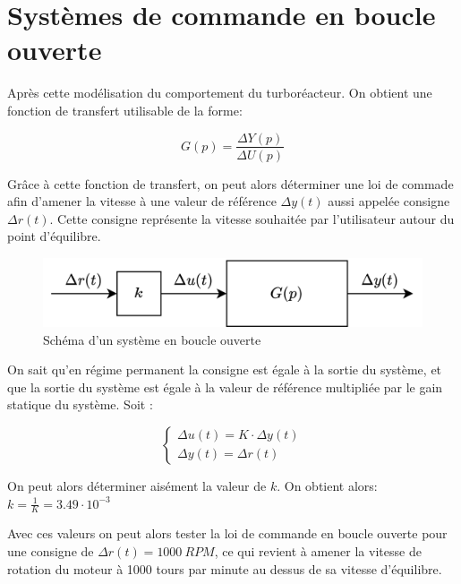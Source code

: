 \documentclass[12pt]{report}
\begin{document}
\newpage

\section{Systèmes de commande en boucle ouverte}

Après cette modélisation du comportement du turboréacteur. On obtient une 
fonction de transfert utilisable de la forme:

\begin{equation}
  G(p) = \frac{\Delta Y(p)}{\Delta U(p)}
\end{equation}

Grâce à cette fonction de transfert, on peut alors déterminer une loi de commade afin
d'amener la vitesse à une valeur de référence $\Delta y(t)$ aussi appelée consigne $\Delta r(t)$.
Cette consigne représente la vitesse souhaitée par l'utilisateur autour du point d'équilibre.

\begin{figure}[h]
  \centering
  \vspace{0.2cm}
  \includegraphics[scale=0.25]{fig/open_loop_system.png}
  \caption{Schéma d'un système en boucle ouverte}
\end{figure}

On sait qu'en régime permanent la consigne est égale à la sortie du système, et que
la sortie du système est égale à la valeur de référence multipliée par le gain
statique du système. Soit :

\begin{equation}
  \left\{
  \begin{matrix}
    \Delta u(t) = K \cdot \Delta y(t) \\
    \Delta y(t) = \Delta r(t)
  \end{matrix}
  \right.
\end{equation}

On peut alors déterminer aisément la valeur de $k$. On obtient alors: $k = \frac{1}{K} = 3.49 \cdot 10^{-3}$

Avec ces valeurs on peut alors tester la loi de commande en boucle ouverte 
pour une consigne de $\Delta r(t) = 1000 ~ RPM$, ce qui revient à amener la vitesse
de rotation du moteur à 1000 tours par minute au dessus de sa vitesse d'équilibre.
\end{document}
